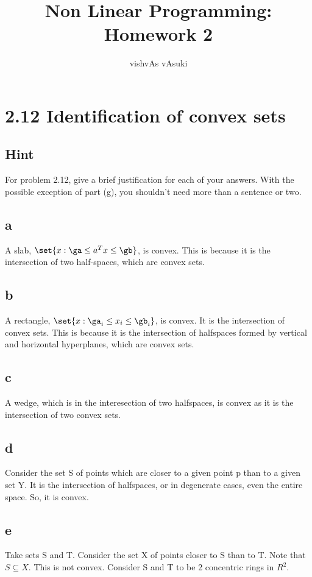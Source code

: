 \documentclass{article}
\title{Non Linear Programming: Homework 2}
\author{vishvAs vAsuki}
\begin{document}
\maketitle

\section{2.12 Identification of convex sets}
\subsection{Hint}
For problem 2.12, give a brief justification for each of your answers. With the possible exception of part (g), you shouldn't need more than a sentence or two.

\subsection{a}
A slab, $\set{x: \ga \leq a^{T}x \leq \gb}$, is convex. This is because it is the intersection of two half-spaces, which are convex sets.

\subsection{b}
A rectangle, $\set{x:\ga_i \leq x_i \leq \gb_i}$, is convex. It is the intersection of convex sets. This is because it is the intersection of halfspaces formed by vertical and horizontal hyperplanes, which are convex sets.

\subsection{c}
A wedge, which is in the interesection of two halfspaces, is convex as it is the intersection of two convex sets.

\subsection{d}
Consider the set S of points which are closer to a given point p than to a given set Y. It is the intersection of halfspaces, or in degenerate cases, even the entire space. So, it is convex.

\subsection{e}
Take sets S and T. Consider the set X of points closer to S than to T. Note that $S \subseteq X$. This is not convex. Consider S and T to be 2 concentric rings in $R^{2}$.
\end{document}
